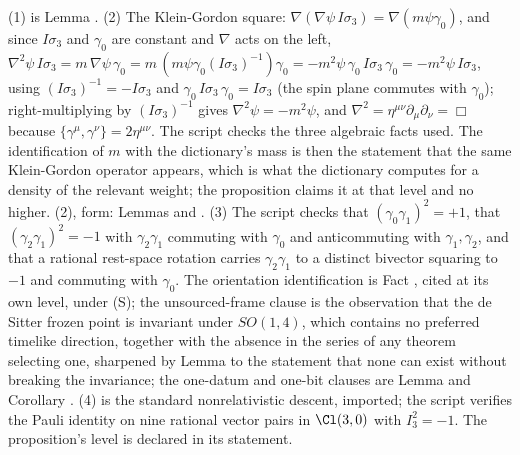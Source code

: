 (1) is Lemma . (2) The Klein-Gordon square: $\nabla(\nabla\psi\,I\sigma_{3}) = \nabla(m\psi\gamma_{0})$, and since $I\sigma_{3}$ and $\gamma_{0}$ are constant and $\nabla$ acts on the left, $\nabla^{2}\psi\, I\sigma_{3} = m\,\nabla\psi\,\gamma_{0} = m\,(m\psi\gamma_{0}(I\sigma_{3})^{-1})\gamma_{0} = -m^{2}\psi\,\gamma_{0}\,I\sigma_{3}\,\gamma_{0} = -m^{2}\psi\, I\sigma_{3}$, using $(I\sigma_{3})^{-1} = -I\sigma_{3}$ and $\gamma_{0}\,I\sigma_{3}\,\gamma_{0} = I\sigma_{3}$ (the spin plane commutes with $\gamma_{0}$); right-multiplying by $(I\sigma_{3})^{-1}$ gives $\nabla^{2}\psi = -m^{2}\psi$, and $\nabla^{2} = \eta^{\mu\nu}\partial_{\mu}\partial_{\nu} = \Box$ because $\{\gamma^{\mu}, \gamma^{\nu}\} = 2\eta^{\mu\nu}$. The script checks the three algebraic facts used. The identification of $m$ with the dictionary's mass is then the statement that the same Klein-Gordon operator appears, which is what the dictionary computes for a density of the relevant weight; the proposition claims it at that level and no higher. (2), form: Lemmas  and . (3) The script checks that $(\gamma_{0}\gamma_{1})^{2} = +1$, that $(\gamma_{2}\gamma_{1})^{2} = -1$ with $\gamma_{2}\gamma_{1}$ commuting with $\gamma_{0}$ and anticommuting with $\gamma_{1}, \gamma_{2}$, and that a rational rest-space rotation carries $\gamma_{2}\gamma_{1}$ to a distinct bivector squaring to $-1$ and commuting with $\gamma_{0}$. The orientation identification is Fact , cited at its own level, under (S); the unsourced-frame clause is the observation that the de Sitter frozen point is invariant under $SO(1,4)$, which contains no preferred timelike direction, together with the absence in the series of any theorem selecting one, sharpened by Lemma  to the statement that none can exist without breaking the invariance; the one-datum and one-bit clauses are Lemma  and Corollary . (4) is the standard nonrelativistic descent, imported; the script verifies the Pauli identity on nine rational vector pairs in $\Cl(3,0)$ with $I_{3}^{2} = -1$. The proposition's level is declared in its statement.
